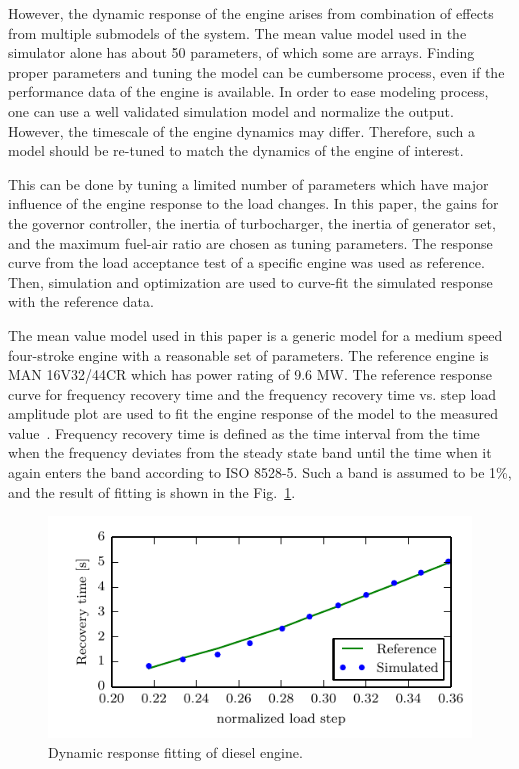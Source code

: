 \documentclass[journal]{IEEEtran}
\begin{document}
However, the dynamic response of the engine arises from combination of effects from multiple submodels of the system. 
The mean value model used in the simulator alone has about 50 parameters, of which some are arrays. 
Finding proper parameters and tuning the model can be cumbersome process, even if the performance data of the engine is available. 
In order to ease modeling process, one can use a well validated simulation model and normalize the output. 
However, the timescale of the engine dynamics may differ.
Therefore, such a model should be re-tuned to match the dynamics of the engine of interest. 

This can be done by tuning a limited number of parameters which have major influence of the engine response to the load changes. 
In this paper, the gains for the governor controller, the inertia of turbocharger,  the inertia of generator set, and the maximum fuel-air ratio are chosen as tuning parameters. 
The response curve from the load acceptance test of a specific engine was used as reference. 
Then, simulation and optimization are used to curve-fit the simulated response with the reference data. 

The mean value model used in this paper is a generic model for a medium speed four-stroke engine with a reasonable set of parameters. The reference engine is MAN 16V32/44CR which has power rating of 9.6 MW. 
The reference response curve for frequency recovery time and the frequency recovery time vs. step load amplitude plot are used to fit the engine response of the model to the measured value~\cite{MANEnginesandSystems2013}. 
Frequency recovery time is defined as the time interval from the time when the frequency deviates from the steady state band until the time when it again enters the band according to ISO 8528-5. 
Such a band is assumed to be 1\%, and the result of fitting is shown in the Fig.~\ref{fig:MVMResponseTimeCurve}.
\begin{figure}
	\includegraphics[width=\columnwidth]{figures/MVMResponseTimeCurve.pdf}
	\caption{Dynamic response fitting of diesel engine.}
	\label{fig:MVMResponseTimeCurve}
\end{figure}
\end{document}
